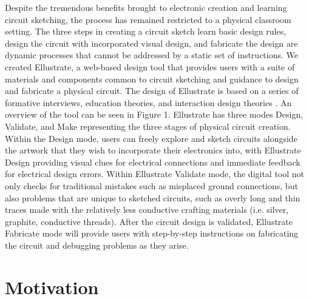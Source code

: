 \documentclass{sigchi}
\begin{document}
Despite the tremendous benefits brought to electronic creation and learning circuit sketching, the process has remained restricted to a physical classroom setting.
The three steps in creating a circuit sketch \textendash learn basic design rules, design the circuit with incorporated visual design, and fabricate the design \textendash are dynamic processes that cannot be addressed by a static set of instructions.
We created Ellustrate, a web-based design tool that provides users with a suite of materials and components common to circuit sketching and guidance to design and fabricate a physical circuit.
The design of Ellustrate is based on a series of formative interviews, education theories, and interaction design theories .
An overview of the tool can be seen in Figure 1. Ellustrate has three modes \textendash Design, Validate, and Make \textendash representing the three stages of physical circuit creation.
Within the Design mode, users can freely explore and sketch circuits alongside the artwork that they wish to incorporate their electronics into, with Ellustrate Design providing visual clues for electrical connections and immediate feedback for electrical design errors.
Within Ellustrate Validate mode, the digital tool not only checks for traditional mistakes such as misplaced ground connections, but also problems that are unique to sketched circuits, such as overly long and thin traces made with the relatively less conductive crafting materials (i.e. silver, graphite, conductive threads). After the circuit design is validated, Ellustrate Fabricate mode will provide users with step-by-step instructions on fabricating the circuit and debugging problems as they arise.

\section{Motivation}
\end{document}
